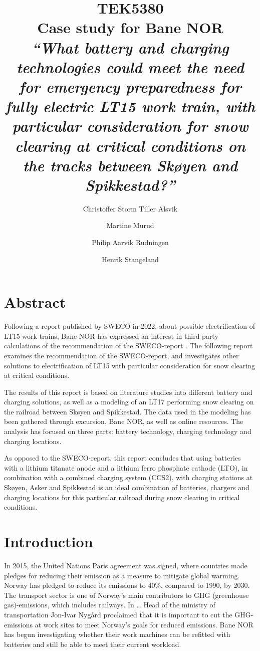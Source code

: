 \documentclass{article}
\title{ \small TEK5380 \\
\LARGE Case study for Bane NOR \\
\vspace*{5mm} \small \textit{“What battery and charging technologies could meet the need for emergency preparedness for fully electric LT15 work train, with particular consideration for snow clearing at critical conditions on the tracks between Skøyen and Spikkestad?”}
}
\author{Christoffer Storm Tiller Alsvik \and Martine Murud \and Philip Aarvik Rudningen \and Henrik Stangeland}
\date{}
\begin{document}
\maketitle


\section{Abstract}

Following a report published by SWECO in 2022, about possible electrification of LT15 work trains, Bane NOR has expressed an interest in third party calculations of the recommendation of the SWECO-report \cite{sweco}. The following report examines the recommendation of the SWECO-report, and investigates other solutions to electrification of LT15 with particular consideration for snow clearing at critical conditions.

The results of this report is based on literature studies into different battery and charging solutions, as well as a modeling of an LT17 performing snow clearing on the railroad between Skøyen and Spikkestad. The data used in the modeling has been gathered through excursion, Bane NOR, as well as online resources. The analysis has focused on three parts: battery technology, charging technology and charging locations.

As opposed to the SWECO-report, this report concludes that using batteries with a lithium titanate anode and a lithium ferro phosphate cathode (LTO), in combination with a combined charging system (CCS2), with charging stations at Skøyen, Asker and Spikkestad is an ideal combination of batteries, chargers and charging locations for this particular railroad during snow clearing in critical conditions.

\section{Introduction}
In 2015, the United Nations Paris agreement was signed, where countries made pledges for reducing their emission as a measure to mitigate global warming. Norway has pledged to reduce its emissions to 40\%, compared to 1990, by 2030. The transport sector is one of Norway’s main contributors to GHG (greenhouse gas)-emissions, which includes railways. In … Head of the ministry of transportation Jon-Ivar Nygård proclaimed that it is important to cut the GHG-emissions at work sites to meet Norway’s goals for reduced emissions. Bane NOR has begun investigating whether their work machines can be refitted with batteries and still be able to meet their current workload.
\end{document}
